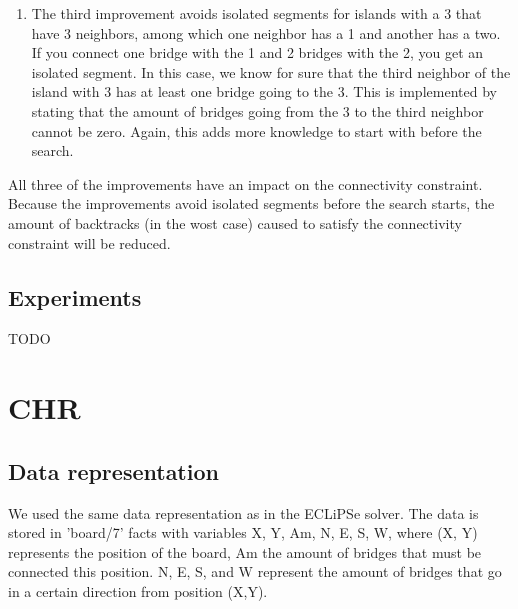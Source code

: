 \documentclass{report}
\begin{document}
\begin{enumerate}
	\item The third improvement avoids isolated segments for islands with a 3 that have 3 neighbors, among which one neighbor has a 1 and another has a two. If you connect one bridge with the 1 and 2 bridges with the 2, you get an isolated segment. In this case, we know for sure that the third neighbor of the island with 3 has at least one bridge going to the 3. This is implemented by stating that the amount of bridges going from the 3 to the third neighbor cannot be zero. Again, this adds more knowledge to start with before the search.
\end{enumerate}

All three of the improvements have an impact on the connectivity constraint. Because the improvements avoid isolated segments before the search starts, the amount of backtracks (in the wost case) caused to satisfy the connectivity constraint will be reduced.

\subsection{Experiments}
    TODO

\newpage
\section{CHR}
\subsection{Data representation}
We used the same data representation as in the ECLiPSe solver. The data is stored in 'board/7' facts with variables X, Y, Am, N, E, S, W, where (X, Y) represents the position of the board, Am the amount of bridges that must be connected this position. N, E, S, and W represent the amount of bridges that go in a certain direction from position (X,Y).
\end{document}
